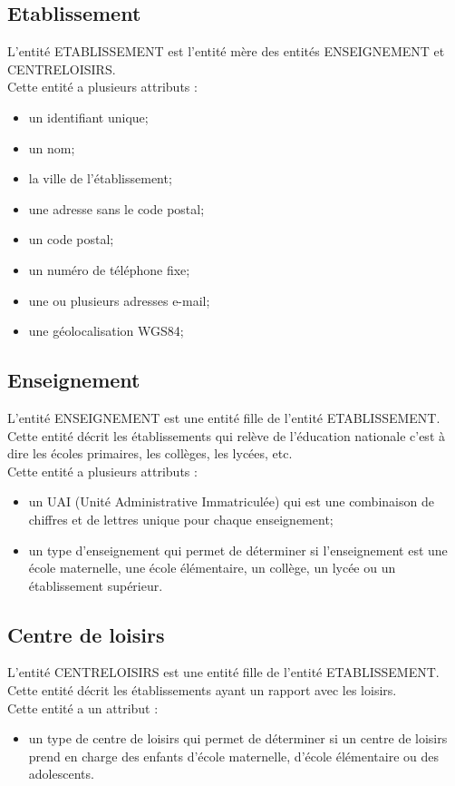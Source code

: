 \documentclass[asi, sansVersion]{picInsa}
\begin{document}
\subsection*{Etablissement}

L'entité ETABLISSEMENT est l'entité mère des entités ENSEIGNEMENT et CENTRELOISIRS. \\
Cette entité a plusieurs attributs : 
\begin{itemize}
\item un identifiant unique;
\item un nom;
\item la ville de l'établissement;
\item une adresse sans le code postal;
\item un code postal;
\item un numéro de téléphone fixe;
\item une ou plusieurs adresses e-mail; %
\item une géolocalisation WGS84; %
\end{itemize}

\subsection*{Enseignement}
L'entité ENSEIGNEMENT est une entité fille de l'entité ETABLISSEMENT. Cette entité décrit les établissements qui relève de l'éducation nationale c'est à dire les écoles primaires, les collèges, les lycées, etc. \\
Cette entité a plusieurs attributs : 
\begin{itemize}
\item un UAI (Unité Administrative Immatriculée) qui est une combinaison de chiffres et de lettres unique pour chaque enseignement;
\item un type d'enseignement qui permet de déterminer si l'enseignement est une école maternelle, une école élémentaire, un collège, un lycée ou un établissement supérieur. 
\end{itemize} 


\subsection*{Centre de loisirs}
L'entité CENTRELOISIRS est une entité fille de l'entité ETABLISSEMENT. Cette entité décrit les établissements ayant un rapport avec les loisirs. \\
Cette entité a un attribut : 
\begin{itemize}
\item un type de centre de loisirs qui permet de déterminer si un centre de loisirs prend en charge des enfants d'école maternelle, d'école élémentaire ou des adolescents.
\end{itemize}  
\end{document}
